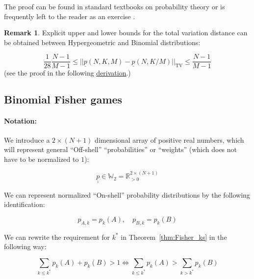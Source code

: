 \documentclass{article}
\theoremstyle{definition}
\newtheorem*{remark}{Remark}
\begin{document}
The proof can be found in standard textbooks on probability theory \cite{book:IntroToProbability} or is frequently left to the reader as an exercise \cite{book:Renyi1970}.

\begin{remark}
    Explicit upper and lower bounds for the total variation distance can be obtained between Hypergeometric and Binomial distributions:

    \begin{equation}
         \frac{1}{28} \frac{N-1}{M-1} \le ||\underline{p}(N,K,M) - \underline{p}(N,K/M)||_{\mathrm{TV}} \le \frac{N-1}{M-1}
    \end{equation}
    (see the proof in the following \href{https://stat.ethz.ch/~kuensch/papers/hypergeom.pdf}{derivation}.)
    
\end{remark}

\subsection{Binomial Fisher games}

\paragraph{Notation:}

We introduce a $2 \times (N+1)$ dimensional array of positive real numbers, which will represent general ``Off-shell'' \cite{book:Weinberg} ``probabilities'' or ``weights'' (which does not have to be normalized to $1$):

\begin{equation}
    \underline{\underline{p}} \in 
    \mathbb{W}_2
    =
    \mathbb{R}_{>0}^{2 \times (N+1)}
\end{equation}

We can represent normalized ``On-shell'' probability distributions by the following identification:

\begin{equation}
    p_{A,k} = p_k(A), \quad p_{B,k} = p_{k}(B)
\end{equation}

We can rewrite the requirement for $k^*$ in Theorem~\ref{thm:Fisher_ks} in the following way:

\begin{equation}
    \sum_{k \le k^*} p_k(A)+p_k(B) > 1 \iff \sum_{k \le k^*} p_k(A) > \sum_{k > k^*} p_k(B)
\end{equation}
\end{document}

